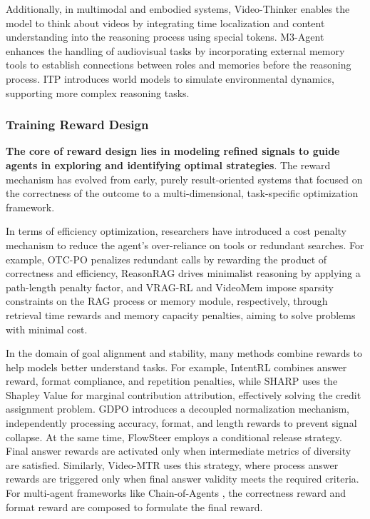 \documentclass{llmxive}
\begin{document}
Additionally, in multimodal and embodied systems, Video-Thinker \cite{Video-Thinker} enables the model to think about videos by integrating time localization and content understanding into the reasoning process using special tokens. M3-Agent \cite{M3-Agent} enhances the handling of audiovisual tasks by incorporating external memory tools to establish connections between roles and memories before the reasoning process. ITP \cite{ITP} introduces world models to simulate environmental dynamics, supporting more complex reasoning tasks.

\subsubsection{Training Reward Design}
\label{sec:reward_shaping}
\textbf{The core of reward design lies in modeling refined signals to guide agents in exploring and identifying optimal strategies}. The reward mechanism has evolved from early, purely result-oriented systems that focused on the correctness of the outcome to a multi-dimensional, task-specific optimization framework.

In terms of efficiency optimization, researchers have introduced a cost penalty mechanism to reduce the agent's over-reliance on tools or redundant searches. For example, OTC-PO \cite{OTC-PO} penalizes redundant calls by rewarding the product of correctness and efficiency, ReasonRAG \cite{ReasonRAG} drives minimalist reasoning by applying a path-length penalty factor, and VRAG-RL \cite{VRAG-RL} and VideoMem \cite{VideoMem} impose sparsity constraints on the RAG process or memory module, respectively, through retrieval time rewards and memory capacity penalties, aiming to solve problems with minimal cost.

In the domain of goal alignment and stability, many methods combine rewards to help models better understand tasks. For example, IntentRL \cite{IntentRL} combines answer reward, format compliance, and repetition penalties, while SHARP \cite{SHARP} uses the Shapley Value for marginal contribution attribution, effectively solving the credit assignment problem. GDPO \cite{GDPO} introduces a decoupled normalization mechanism, independently processing accuracy, format, and length rewards to prevent signal collapse. At the same time, FlowSteer \cite{FlowSteer} employs a conditional release strategy. Final answer rewards are activated only when intermediate metrics of diversity are satisfied. Similarly, Video-MTR \cite{Video-MTR} uses this strategy, where process answer rewards are triggered only when final answer validity meets the required criteria. For multi-agent frameworks like Chain-of-Agents \cite{Chain-of-Agents}, the correctness reward and format reward are composed to formulate the final reward.
\end{document}

